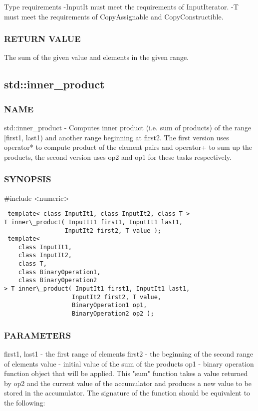  Type requirements
 -InputIt must meet the requirements of InputIterator.
 -T must meet the requirements of CopyAssignable and CopyConstructible.

\subsubsection{RETURN VALUE}
The sum of the given value and elements in the given range.



\subsection{std::inner\_product}

\subsubsection{NAME}
std::inner\_product - Computes inner product (i.e. sum of products) of the range [first1, last1) and another range beginning at first2. The first version uses operator* to compute product of the element pairs and operator+ to sum up the products, the second version uses op2 and op1 for these tasks respectively.

\subsubsection{SYNOPSIS}
\#include <numeric>

\begin{lstlisting}
 template< class InputIt1, class InputIt2, class T >
T inner\_product( InputIt1 first1, InputIt1 last1,
                 InputIt2 first2, T value );
 template<
    class InputIt1,
    class InputIt2,
    class T,
    class BinaryOperation1,
    class BinaryOperation2
> T inner\_product( InputIt1 first1, InputIt1 last1,
                   InputIt2 first2, T value,
                   BinaryOperation1 op1,
                   BinaryOperation2 op2 );
\end{lstlisting}

\subsubsection{PARAMETERS}
first1, last1 - the first range of elements
first2 - the beginning of the second range of elements
value - initial value of the sum of the products
op1 - binary operation function object that will be applied.  This "sum" function takes a value returned by op2 and the current value of the accumulator and produces a new value to be stored in the accumulator.
The signature of the function should be equivalent to the following:

